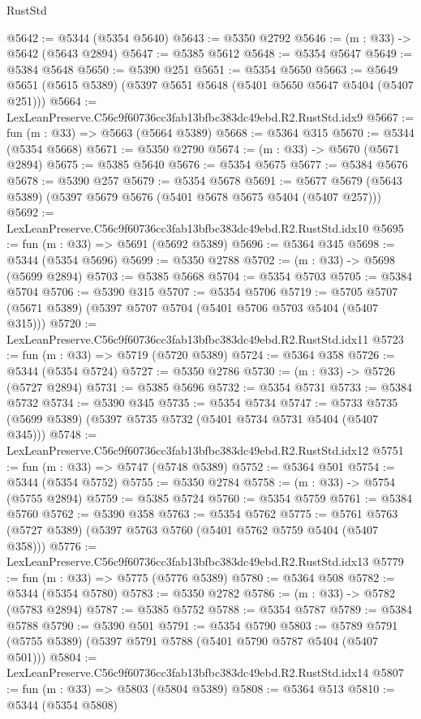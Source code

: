 \begin{lexlean}{RustStd}
\begin{coremodule}
@5642 := @5344 (@5354 @5640)
@5643 := @5350 @2792
@5646 := (m : @33) -> @5642 (@5643 @2894)
@5647 := @5385 @5612
@5648 := @5354 @5647
@5649 := @5384 @5648
@5650 := @5390 @251
@5651 := @5354 @5650
@5663 := @5649 @5651 (@5615 @5389) (@5397 @5651 @5648 (@5401 @5650 @5647 @5404 (@5407 @251)))
@5664 := LexLeanPreserve.C56c9f60736cc3fab13bfbc383dc49ebd.R2.RustStd.idx9
@5667 := fun (m : @33) => @5663 (@5664 @5389)
@5668 := @5364 @315
@5670 := @5344 (@5354 @5668)
@5671 := @5350 @2790
@5674 := (m : @33) -> @5670 (@5671 @2894)
@5675 := @5385 @5640
@5676 := @5354 @5675
@5677 := @5384 @5676
@5678 := @5390 @257
@5679 := @5354 @5678
@5691 := @5677 @5679 (@5643 @5389) (@5397 @5679 @5676 (@5401 @5678 @5675 @5404 (@5407 @257)))
@5692 := LexLeanPreserve.C56c9f60736cc3fab13bfbc383dc49ebd.R2.RustStd.idx10
@5695 := fun (m : @33) => @5691 (@5692 @5389)
@5696 := @5364 @345
@5698 := @5344 (@5354 @5696)
@5699 := @5350 @2788
@5702 := (m : @33) -> @5698 (@5699 @2894)
@5703 := @5385 @5668
@5704 := @5354 @5703
@5705 := @5384 @5704
@5706 := @5390 @315
@5707 := @5354 @5706
@5719 := @5705 @5707 (@5671 @5389) (@5397 @5707 @5704 (@5401 @5706 @5703 @5404 (@5407 @315)))
@5720 := LexLeanPreserve.C56c9f60736cc3fab13bfbc383dc49ebd.R2.RustStd.idx11
@5723 := fun (m : @33) => @5719 (@5720 @5389)
@5724 := @5364 @358
@5726 := @5344 (@5354 @5724)
@5727 := @5350 @2786
@5730 := (m : @33) -> @5726 (@5727 @2894)
@5731 := @5385 @5696
@5732 := @5354 @5731
@5733 := @5384 @5732
@5734 := @5390 @345
@5735 := @5354 @5734
@5747 := @5733 @5735 (@5699 @5389) (@5397 @5735 @5732 (@5401 @5734 @5731 @5404 (@5407 @345)))
@5748 := LexLeanPreserve.C56c9f60736cc3fab13bfbc383dc49ebd.R2.RustStd.idx12
@5751 := fun (m : @33) => @5747 (@5748 @5389)
@5752 := @5364 @501
@5754 := @5344 (@5354 @5752)
@5755 := @5350 @2784
@5758 := (m : @33) -> @5754 (@5755 @2894)
@5759 := @5385 @5724
@5760 := @5354 @5759
@5761 := @5384 @5760
@5762 := @5390 @358
@5763 := @5354 @5762
@5775 := @5761 @5763 (@5727 @5389) (@5397 @5763 @5760 (@5401 @5762 @5759 @5404 (@5407 @358)))
@5776 := LexLeanPreserve.C56c9f60736cc3fab13bfbc383dc49ebd.R2.RustStd.idx13
@5779 := fun (m : @33) => @5775 (@5776 @5389)
@5780 := @5364 @508
@5782 := @5344 (@5354 @5780)
@5783 := @5350 @2782
@5786 := (m : @33) -> @5782 (@5783 @2894)
@5787 := @5385 @5752
@5788 := @5354 @5787
@5789 := @5384 @5788
@5790 := @5390 @501
@5791 := @5354 @5790
@5803 := @5789 @5791 (@5755 @5389) (@5397 @5791 @5788 (@5401 @5790 @5787 @5404 (@5407 @501)))
@5804 := LexLeanPreserve.C56c9f60736cc3fab13bfbc383dc49ebd.R2.RustStd.idx14
@5807 := fun (m : @33) => @5803 (@5804 @5389)
@5808 := @5364 @513
@5810 := @5344 (@5354 @5808)

\end{coremodule}
\end{lexlean}
